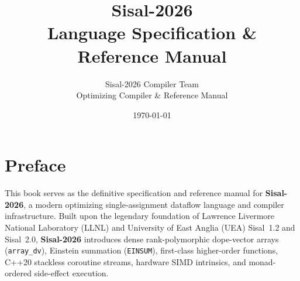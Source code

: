 \documentclass[11pt,a4paper,oneside]{book}
\title{\Huge\bfseries Sisal-2026 \\ \Large Language Specification \& Reference Manual}
\author{\Large Sisal-2026 Compiler Team \\ \small Optimizing Compiler & Reference Manual}
\date{\today}
\begin{document}
\frontmatter


\cleardoublepage
\tableofcontents

\cleardoublepage
\chapter*{Preface}

This book serves as the definitive specification and reference manual for \textbf{Sisal-2026}, a modern optimizing single-assignment dataflow language and compiler infrastructure. Built upon the legendary foundation of Lawrence Livermore National Laboratory (LLNL) and University of East Anglia (UEA) Sisal~1.2 and Sisal~2.0, \textbf{Sisal-2026} introduces dense rank-polymorphic dope-vector arrays (\texttt{array\_dv}), Einstein summation (\texttt{EINSUM}), first-class higher-order functions, C++20 stackless coroutine streams, hardware SIMD intrinsics, and monad-ordered side-effect execution.

\mainmatter

















\backmatter


\end{document}
